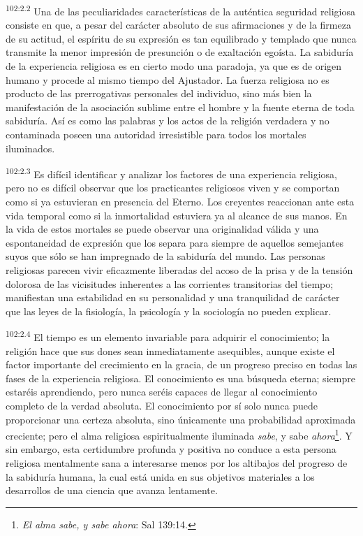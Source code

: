 \par
\textsuperscript{102:2.2} Una de las peculiaridades características de la auténtica seguridad religiosa consiste en que, a pesar del carácter absoluto de sus afirmaciones y de la firmeza de su actitud, el espíritu de su expresión es tan equilibrado y templado que nunca transmite la menor impresión de presunción o de exaltación egoísta. La sabiduría de la experiencia religiosa es en cierto modo una paradoja, ya que es de origen humano y procede al mismo tiempo del Ajustador. La fuerza religiosa no es producto de las prerrogativas personales del individuo, sino más bien la manifestación de la asociación sublime entre el hombre y la fuente eterna de toda sabiduría. Así es como las palabras y los actos de la religión verdadera y no contaminada poseen una autoridad irresistible para todos los mortales iluminados.

\par
\textsuperscript{102:2.3} Es difícil identificar y analizar los factores de una experiencia religiosa, pero no es difícil observar que los practicantes religiosos viven y se comportan como si ya estuvieran en presencia del Eterno. Los creyentes reaccionan ante esta vida temporal como si la inmortalidad estuviera ya al alcance de sus manos. En la vida de estos mortales se puede observar una originalidad válida y una espontaneidad de expresión que los separa para siempre de aquellos semejantes suyos que sólo se han impregnado de la sabiduría del mundo. Las personas religiosas parecen vivir eficazmente liberadas del acoso de la prisa y de la tensión dolorosa de las vicisitudes inherentes a las corrientes transitorias del tiempo; manifiestan una estabilidad en su personalidad y una tranquilidad de carácter que las leyes de la fisiología, la psicología y la sociología no pueden explicar.

\par
\textsuperscript{102:2.4} El tiempo es un elemento invariable para adquirir el conocimiento; la religión hace que sus dones sean inmediatamente asequibles, aunque existe el factor importante del crecimiento en la gracia, de un progreso preciso en todas las fases de la experiencia religiosa. El conocimiento es una búsqueda eterna; siempre estaréis aprendiendo, pero nunca seréis capaces de llegar al conocimiento completo de la verdad absoluta. El conocimiento por sí solo nunca puede proporcionar una certeza absoluta, sino únicamente una probabilidad aproximada creciente; pero el alma religiosa espiritualmente iluminada \textit{sabe}, y sabe \textit{ahora}\footnote{\textit{El alma sabe, y sabe ahora}: Sal 139:14.}. Y sin embargo, esta certidumbre profunda y positiva no conduce a esta persona religiosa mentalmente sana a interesarse menos por los altibajos del progreso de la sabiduría humana, la cual está unida en sus objetivos materiales a los desarrollos de una ciencia que avanza lentamente.

